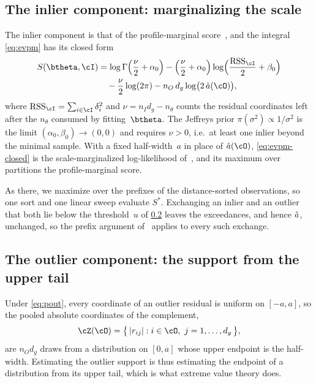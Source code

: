 \subsection{The inlier component: marginalizing the scale}
\label{sec:inlier}

The inlier component is that of the profile-marginal
score~\cite{Pritts2026}, and the integral \cref{eq:evpm} has its closed
form
\begin{equation}
	\begin{aligned}
		S(\btheta, \cI)
		 & = \log\Gamma\Bigl(\frac{\nu}{2} + \alpha_0\Bigr)
		- \Bigl(\frac{\nu}{2} + \alpha_0\Bigr)
		\log\Bigl(\frac{\RSS_\cI}{2} + \beta_0\Bigr) \\
		 & \quad - \frac{\nu}{2}\log(2\pi)
		- n_O\,d_g\log\bigl(2\,\ahat(\cO)\bigr),
	\end{aligned}
	\label{eq:evpm-closed}
\end{equation}
where $\RSS_\cI = \sum_{i\in\cI}\delta_i^2$ and $\nu = n_I d_g - n_\theta$
counts the residual coordinates left after the $n_\theta$ consumed by
fitting~$\btheta$.  The Jeffreys prior $\pi(\sigma^2) \propto 1/\sigma^2$ is
the limit $(\alpha_0, \beta_0) \to (0,0)$ and requires $\nu > 0$, i.e.\ at
least one inlier beyond the minimal sample.  With a fixed half-width~$a$ in
place of $\ahat(\cO)$, \cref{eq:evpm-closed} is the scale-marginalized
log-likelihood of~\cite{Pritts2026}, and its maximum over partitions the
profile-marginal score.

As there, we maximize over the prefixes of the distance-sorted
observations, so one sort and one linear sweep evaluate
$S^*$.  Exchanging an inlier and an outlier that both lie
below the threshold~$u$ of \cref{sec:outlier} leaves the exceedances, and
hence $\hat a$, unchanged, so the prefix argument of~\cite{Pritts2026}
applies to every such exchange.

\subsection{The outlier component: the support from the upper tail}
\label{sec:outlier}

Under \cref{eq:pout}, every coordinate of an outlier residual is uniform on
$[-a, a]$, so the pooled absolute coordinates of the complement,
\begin{equation}
	\cZ(\cO) = \bigl\{\, |r_{ij}| : i \in \cO,\ j = 1,\ldots,d_g \,\bigr\},
	\label{eq:pooled}
\end{equation}
are $n_O d_g$ draws from a distribution on $[0, a]$ whose upper endpoint is
the half-width.  Estimating the outlier support is thus estimating the
endpoint of a distribution from its upper tail, which is what extreme value
theory does.

